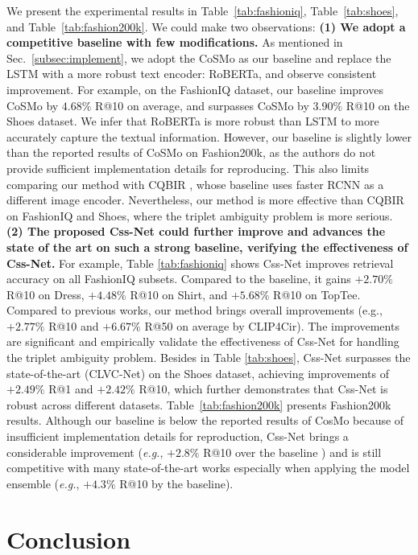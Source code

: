 \documentclass[sigconf]{acmart}
\def\eg{\emph{e.g.}}
\begin{document}
We present the experimental results in Table~\ref{tab:fashioniq}, Table~\ref{tab:shoes}, and Table~\ref{tab:fashion200k}. 
We could make two observations: \textbf{(1) We adopt a competitive baseline with few modifications.} As mentioned in Sec.~\ref{subsec:implement}, we adopt the CoSMo as our baseline and replace the LSTM with a more robust text encoder: RoBERTa, and observe consistent improvement. For example, on the FashionIQ dataset, our baseline improves CoSMo by $4.68\%$ R@10 on average, and surpasses CoSMo by $3.90\%$ R@10 on the Shoes dataset. We infer that RoBERTa is more robust than LSTM \cite{hochreiter1997long} to more accurately capture the textual information. However, our baseline is slightly lower than the reported results of CoSMo on Fashion200k, as the authors do not provide sufficient implementation details for reproducing. This also limits comparing our method with CQBIR \cite{zhang2022comprehensive}, whose baseline uses faster RCNN \cite{girshick2015fast} as a different image encoder. Nevertheless, our method is more effective than CQBIR on FashionIQ and Shoes, where the triplet ambiguity problem is more serious.
\textbf{(2) The proposed Css-Net could further improve and advances the state of the art on such a strong baseline, verifying the effectiveness of Css-Net.} For example, Table \ref{tab:fashioniq} shows Css-Net improves retrieval accuracy on all FashionIQ subsets. Compared to the baseline, it gains $+2.70\%$ R@10 on Dress, $+4.48\%$ R@10 on Shirt, and $+5.68\%$ R@10 on TopTee. Compared to previous works, our method brings overall improvements (e.g., $+2.77\%$ R@10 and $+6.67\%$ R@50 on average by CLIP4Cir). The improvements are significant and empirically validate the effectiveness of Css-Net for handling the triplet ambiguity problem. Besides in Table \ref{tab:shoes}, Css-Net surpasses the state-of-the-art (CLVC-Net) on the Shoes dataset, achieving improvements of $+2.49\%$ R@1 and $+2.42\%$ R@10, which further demonstrates that Css-Net is robust across different datasets. Table~\ref{tab:fashion200k} presents Fashion200k results. Although our baseline is below the reported results of CosMo because of insufficient implementation details for reproduction, Css-Net brings a considerable improvement (\eg, $+2.8\%$ R@10 over the baseline ) and is still competitive with many state-of-the-art works especially when applying the model ensemble (\eg, $+4.3\%$ R@10 by the baseline).


\section{Conclusion} \label{conclusion}
\end{document}

